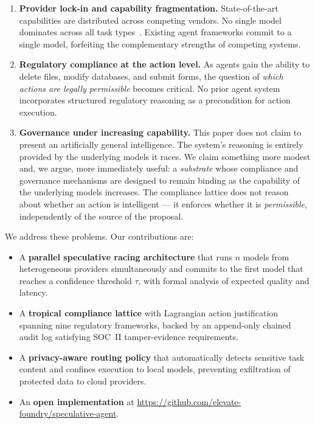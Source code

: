 \documentclass[11pt,twocolumn]{article}
\begin{document}
\begin{enumerate}
  \item \textbf{Provider lock-in and capability fragmentation.} State-of-the-art
  capabilities are distributed across competing vendors. No single model dominates
  across all task types~\cite{openai2024gpt4,anthropic2024claude,google2024gemini}.
  Existing agent frameworks commit to a single model, forfeiting the
  complementary strengths of competing systems.

  \item \textbf{Regulatory compliance at the action level.} As agents gain the
  ability to delete files, modify databases, and submit forms, the question of
  \emph{which actions are legally permissible} becomes critical. No prior agent
  system incorporates structured regulatory reasoning as a precondition for action
  execution.

  \item \textbf{Governance under increasing capability.} This paper does not claim
  to present an artificially general intelligence. The system's reasoning is entirely
  provided by the underlying models it races. We claim something more modest and, we
  argue, more immediately useful: a \emph{substrate} whose compliance and governance
  mechanisms are designed to remain binding as the capability of the underlying models
  increases. The compliance lattice does not reason about whether an action is
  intelligent — it enforces whether it is \emph{permissible}, independently of the
  source of the proposal.
\end{enumerate}

We address these problems. Our contributions are:

\begin{itemize}
  \item A \textbf{parallel speculative racing architecture} that runs $n$ models
  from heterogeneous providers simultaneously and commits to the first model that
  reaches a confidence threshold $\tau$, with formal analysis of expected quality
  and latency.

  \item A \textbf{tropical compliance lattice} with Lagrangian action justification
  spanning nine regulatory frameworks, backed by an append-only chained audit log
  satisfying SOC~II tamper-evidence requirements.

  \item A \textbf{privacy-aware routing policy} that automatically detects
  sensitive task content and confines execution to local models, preventing
  exfiltration of protected data to cloud providers.

  \item An \textbf{open implementation} at \url{https://github.com/elevate-foundry/speculative-agent}.
\end{itemize}
\end{document}
